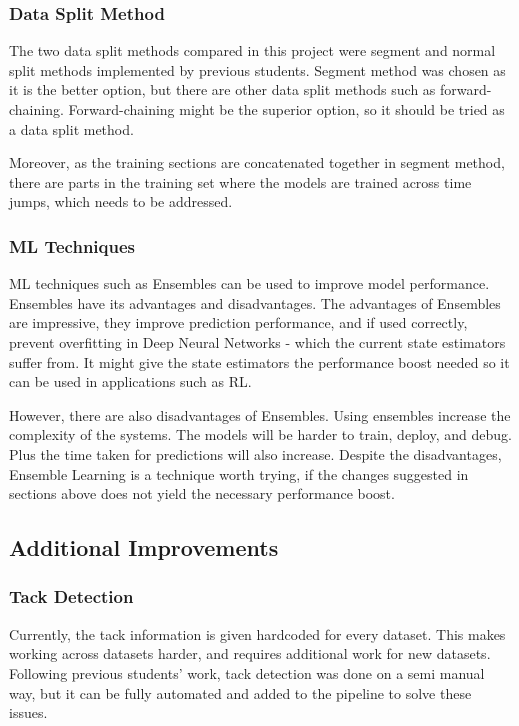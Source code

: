 \documentclass[12pt,twoside]{report}
\begin{document}
\subsubsection{Data Split Method}
The two data split methods compared in this project were segment and normal split methods implemented by previous students. Segment method was chosen as it is the better option, but there are other data split methods such as forward-chaining. Forward-chaining might be the superior option, so it should be tried as a data split method.

Moreover, as the training sections are concatenated together in segment method, there are parts in the training set where the models are trained across time jumps, which needs to be addressed.


\subsubsection{ML Techniques}
ML techniques such as Ensembles can be used to improve model performance. Ensembles have its advantages and disadvantages. The advantages of Ensembles are impressive, they improve prediction performance, and if used correctly, prevent overfitting in Deep Neural Networks \cite{ensembles-paper} - which the current state estimators suffer from. It might give the state estimators the performance boost needed so it can be used in applications such as RL. 

However, there are also disadvantages of Ensembles. Using ensembles increase the complexity of the systems. The models will be harder to train, deploy, and debug. Plus the time taken for predictions will also increase. Despite the disadvantages, Ensemble Learning is a technique worth trying, if the changes suggested in sections above does not yield the necessary performance boost.


\subsection{Additional Improvements}

\subsubsection{Tack Detection}
Currently, the tack information is given hardcoded for every dataset. This makes working across datasets harder, and requires additional work for new datasets. Following previous students' work, tack detection was done on a semi manual way, but it can be fully automated and added to the pipeline to solve these issues.
\end{document}

